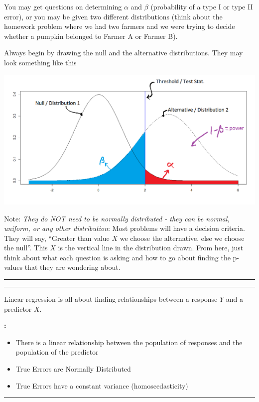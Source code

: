 \documentclass[landscape]{article}
\newcommand{\myline}{\vspace{4pt}\hrule  \vspace{4pt}}
\newcommand{\mynewcolumn}{\columnbreak \myline}
\newcommand{\topic}[2]{
\noindent \textbf{\textsc{\color{harvardcrimson}{#1}}}

\noindent \hspace{-3.5pt}  #2

\myline
}
\newenvironment{tellme}[1]{
\noindent \textbf{\textit{\color{harvardblue}{#1}}:}
\begin{adjustwidth}{9pt}{}
}{
\end{adjustwidth}
}
\newenvironment{compactitem}{
\begin{itemize}[leftmargin=*,labelsep=5pt]
}{
\end{itemize}
}
\begin{document}
\begin{multicols*}{3}
		\topic{Determination of $ \alpha $ and $ \beta $ (Type I \& Type II Error)}{
			You may get questions on determining $ \alpha $ and $ \beta $ (probability of a type I or type II error), or you may be given two different distributions (think about the homework problem where we had two farmers and we were trying to decide whether a pumpkin belonged to Farmer A or Farmer B). 
			
			Always begin by drawing the null and the alternative distributions. They may look something like this 
			
			\includegraphics[width=.95\linewidth]{distrsAnno}
			
			Note: \textit{They do NOT need to be normally distributed - they can be normal, uniform, or any other distribution}:
			Most problems will have a decision criteria. They will say, ``Greater than value $ X $ we choose the alternative, else we choose the null''. This $ X $ is the vertical line in the distribution drawn. From here, just think about what each question is asking and how to go about finding the p-values that they are wondering about. 
		}
	
		\mynewcolumn
		
		
		
		\topic{Linear Regression}{
			Linear regression is all about finding relationships between a response $ Y $ and a predictor $ X $. 
			
			\begin{tellme}{Assumptions}
				\begin{compactitem}
					\item There is a linear relationship between the population of responses and the population of the predictor 
					\item True Errors are Normally Distributed
					\item True Errors have a constant variance (homoscedasticity)
				\end{compactitem}
			\end{tellme}
			
}
\end{multicols*}
\end{document}
